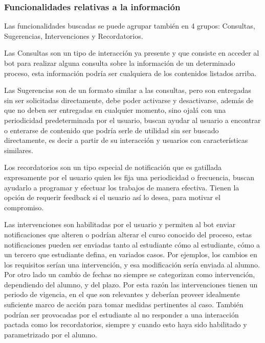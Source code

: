     \subsubsection{Funcionalidades relativas a la información}
    \par Las funcionalidades buscadas se puede agrupar también en 4 grupos: Consultas, Sugerencias, Intervenciones y Recordatorios.
    \par Las Consultas son un tipo de interacción ya presente y que consiste en acceder al bot para realizar alguna consulta sobre la información de un determinado proceso, esta información podría ser cualquiera de los contenidos listados arriba.
    \par Las Sugerencias son de un formato similar a las consultas, pero son entregadas sin ser solicitadas directamente, debe poder activarse y desactivarse, además de que no deben ser entregadas en cualquier momento, sino ojalá con una periodicidad predeterminada por el usuario, buscan ayudar al usuario a encontrar o enterarse de contenido que podría serle de utilidad sin ser buscado directamente, es decir a partir de su interacción y usuarios con características similares.
    \par Los recordatorios son un tipo especial de notificación que es gatillada expresamente por el usuario quien les fija una periodicidad o frecuencia, buscan ayudarlo a programar y efectuar los trabajos de manera efectiva. Tienen la opción de requerir feedback si el usuario así lo desea, para motivar el compromiso.
    \par Las intervenciones son habilitadas por el usuario y permiten al bot enviar notificaciones que alteren o podrían alterar el curso conocido del proceso, estas notificaciones pueden ser enviadas tanto al estudiante cómo al estudiante, cómo a un tercero que estudiante defina, en variados casos. Por ejemplos, los cambios en los requisitos serían una intervención, y esa modificación sería enviada al alumno. Por otro lado un cambio de fechas no siempre se categorizan como intervención, dependiendo del alumno, y del plazo. Por esta razón las intervenciones tienen un periodo de vigencia, en el que son relevantes y deberían proveer idealmente suficiente marco de acción para tomar medidas pertinentes al caso. También podrían ser provocadas por el estudiante al no responder a una interacción pactada como los recordatorios, siempre y cuando esto haya sido habilitado y parametrizado por el alumno.
    
